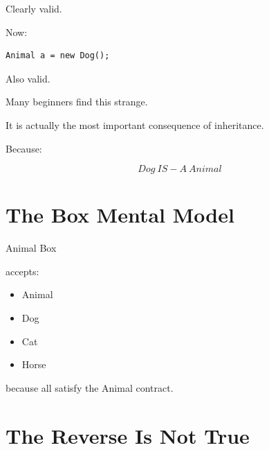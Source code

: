 \documentclass[11pt,a4paper]{book}
\begin{document}
Clearly valid.


Now:

\begin{verbatim}
Animal a = new Dog();
\end{verbatim}


Also valid.


Many beginners find this strange.


It is actually the most important consequence of inheritance.


Because:

\[
Dog\ IS\!-\!A\ Animal
\]


\section{The Box Mental Model}

\begin{mentalmodel}

Animal Box

accepts:

\begin{itemize}
\item Animal
\item Dog
\item Cat
\item Horse
\end{itemize}


because all satisfy the Animal contract.

\end{mentalmodel}


\section{The Reverse Is Not True}
\end{document}
